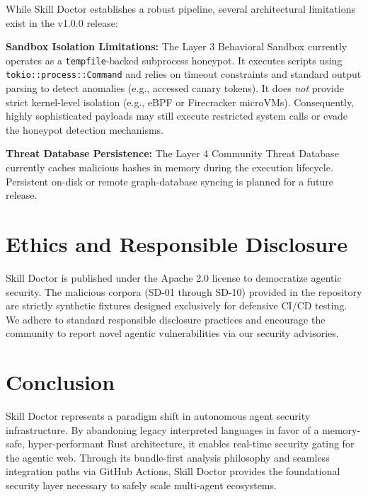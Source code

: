 \documentclass[11pt,letterpaper]{article}
\begin{document}
While Skill Doctor establishes a robust pipeline, several architectural limitations exist in the v1.0.0 release:

\textbf{Sandbox Isolation Limitations:} The Layer 3 Behavioral Sandbox currently operates as a \texttt{tempfile}-backed subprocess honeypot. It executes scripts using \texttt{tokio::process::Command} and relies on timeout constraints and standard output parsing to detect anomalies (e.g., accessed canary tokens). It does \textit{not} provide strict kernel-level isolation (e.g., eBPF or Firecracker microVMs). Consequently, highly sophisticated payloads may still execute restricted system calls or evade the honeypot detection mechanisms.

\textbf{Threat Database Persistence:} The Layer 4 Community Threat Database currently caches malicious hashes in memory during the execution lifecycle. Persistent on-disk or remote graph-database syncing is planned for a future release.

\section{Ethics and Responsible Disclosure}

Skill Doctor is published under the Apache 2.0 license to democratize agentic security. The malicious corpora (SD-01 through SD-10) provided in the repository are strictly synthetic fixtures designed exclusively for defensive CI/CD testing. We adhere to standard responsible disclosure practices and encourage the community to report novel agentic vulnerabilities via our security advisories.

\section{Conclusion}

Skill Doctor represents a paradigm shift in autonomous agent security infrastructure. By abandoning legacy interpreted languages in favor of a memory-safe, hyper-performant Rust architecture, it enables real-time security gating for the agentic web. Through its bundle-first analysis philosophy and seamless integration paths via GitHub Actions, Skill Doctor provides the foundational security layer necessary to safely scale multi-agent ecosystems.



\end{document}
